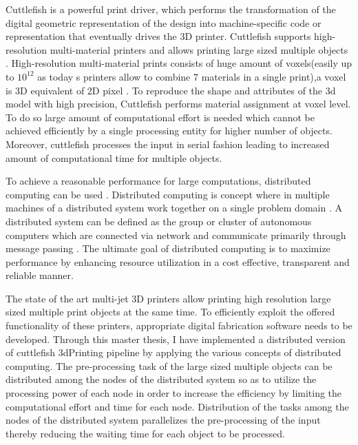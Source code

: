 Cuttlefish is a powerful print driver, which performs the transformation of the digital geometric representation of the design into machine-specific code or representation that eventually drives the 3D printer. Cuttlefish supports high-resolution multi-material printers and allows printing large sized multiple objects \cite{cuttlefish}. High-resolution multi-material prints consists of huge amount of voxels(easily up to \begin{math}10^{12}\end{math} as today \textquotesingle s printers allow to combine 7 materials in a single print),a voxel is 3D equivalent of 2D pixel \cite{3DString}. To reproduce the shape and attributes of the 3d model with high precision, Cuttlefish performs material assignment at voxel level. To do so large amount of computational effort is needed which cannot be achieved efficiently by a single processing entity for higher number of objects.  Moreover, cuttlefish processes the input in serial fashion leading to increased amount of computational time for multiple objects. \newline

To achieve a reasonable performance for large computations, distributed computing can be used \cite{DistComp} \cite{Desai}.  Distributed computing is concept where in multiple machines of a distributed system work together on a single problem domain \cite{rouse}.  A distributed system can be defined as the group or cluster of autonomous computers which are connected via network and communicate primarily through message passing \cite{coulouris}. The ultimate goal of distributed computing is to maximize performance by enhancing resource utilization in a cost effective, transparent and reliable manner.\newline

The state of the art multi-jet 3D printers allow printing high resolution large sized multiple print objects at the same time. To efficiently exploit the offered functionality of these printers, appropriate digital fabrication software needs to be developed. Through this master thesis, I have implemented a distributed version of cuttlefish 3dPrinting pipeline by applying the various concepts of distributed computing. The pre-processing task of the large sized multiple objects can be distributed among the nodes of the distributed system so as to utilize the processing power of each node in order to increase the efficiency by limiting the computational effort and time for each node.   Distribution of the tasks among the nodes of the distributed system parallelizes the pre-processing of the input thereby reducing the waiting time for each object to be processed. 